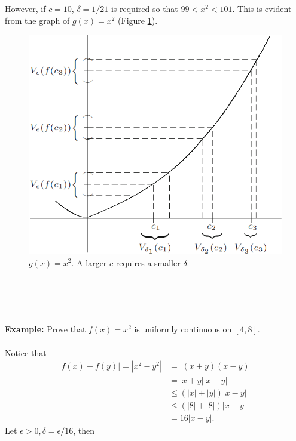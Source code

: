 \documentclass{article}
\begin{document}
            However, if $c=10$, $\delta=1/21$ is required so that $99 < x^2 <101$. This is evident from the graph of $g(x)=x^2$ (Figure \ref{g(x)=x^2}).
            \begin{figure}
                \centering
                \includegraphics[width=0.7\linewidth]{figs/g(x)=x^2.png}
                \caption{$g(x)=x^2$. A larger $c$ requires a smaller $\delta$.}
                \label{g(x)=x^2}
            \end{figure}
           \\ \\ 
            \\ \\
            \textbf{Example:} Prove that $f(x)=x^2$ is uniformly continuous on $[4,8]$.
            \\ \\
            Notice that
            \begin{align*}
                |f(x)-f(y)| = |x^2 - y^2| &= |(x+y)(x-y)| \\
                & = |x+y||x-y| \\
                & \leq (|x|+|y|)|x-y| \\
                & \leq (|8|+|8|)|x-y| \\
                & = 16|x-y|.
            \end{align*}
            Let $\epsilon >0, \delta = \epsilon/16$, then
\end{document}

